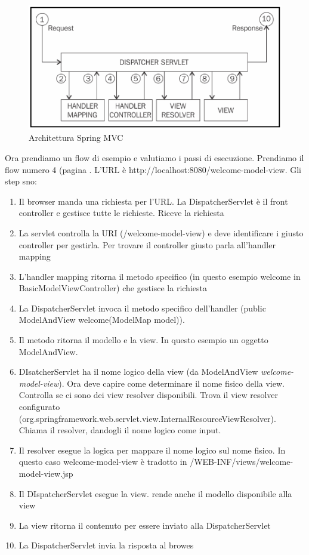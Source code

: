 \documentclass[11pt,a4paper]{book}
\begin{document}
\begin{figure}[h!]
	\begin{center}
		\includegraphics[scale=0.6]{img/032.png}
		\caption{Architettura Spring MVC}
		\label{fig: 032}
	\end{center}
\end{figure}
Ora prendiamo un flow di esempio e valutiamo i passi di esecuzione. Prendiamo il flow numero 4 (pagina \pageref{flow4}. L'URL è http://localhost:8080/welcome-model-view. Gli step sno:
\begin{enumerate}
	\item Il browser manda una richiesta per l'URL. La DispatcherServlet è il front controller e gestisce tutte le richieste. Riceve la richiesta
	\item La servlet controlla la URI (/welcome-model-view) e deve identificare i giusto controller per gestirla. Per trovare il controller giusto parla all'handler mapping
	\item L'handler mapping ritorna il metodo specifico (in questo esempio welcome in BasicModelViewController) che gestisce la richiesta
	\item La DispatcherServlet invoca il metodo specifico dell'handler (public ModelAndView welcome(ModelMap model)).
	\item Il metodo ritorna il modello e la view. In questo esempio un oggetto ModelAndView.
	\item DIsatcherServlet ha il nome logico della view (da ModelAndView \emph{welcome-model-view}). Ora deve capire come determinare il nome fisico della view. Controlla se ci sono dei view resolver disponibili. Trova il view resolver configurato (org.springframework.web.servlet.view.InternalResourceViewResolver). Chiama il resolver, dandogli il nome logico come input. 
	\item Il resolver esegue la logica per mappare il nome logico sul nome fisico. In questo caso welcome-model-view è tradotto in /WEB-INF/views/welcome-model-view.jsp
	\item Il DIspatcherServlet esegue la view. rende anche il modello disponibile alla view
	\item La view ritorna il contenuto per essere inviato alla DispatcherServlet
	\item La DispatcherServlet invia la risposta al browes
\end{enumerate}
\end{document}
